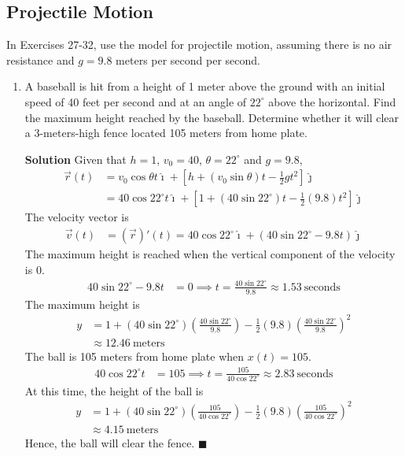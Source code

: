 \documentclass{report}
\begin{document}
\subsection*{Projectile Motion}
In Exercises 27-32, use the model for projectile motion, assuming there is no
air resistance and $g=9.8$ meters per second per second.
\begin{enumerate}
    \item  A baseball is hit from a height of 1 meter above the ground with an initial
          speed of 40 feet per second and at an angle of $22^{\circ}$ above the
          horizontal. Find the maximum height reached by the baseball. Determine whether
          it will clear a 3-meters-high fence located 105 meters from home plate.

          \textbf{Solution} Given that $h = 1$, $v_0 = 40$, $\theta = 22^{\circ}$ and $g = 9.8$,
          \begin{align*}
              \vec{r}(t) & = v_0\cos\theta t\hat{\imath} + \left[h + (v_0\sin\theta) t - \frac{1}{2}gt^2\right]\hat{\jmath}               \\
                         & = 40\cos{22^{\circ}} t\hat{\imath} + \left[1 + (40\sin{22^{\circ}}) t - \frac{1}{2}(9.8)t^2\right]\hat{\jmath}
          \end{align*}
          The velocity vector is
          \begin{align*}
              \vec{v}(t) & = (\vec{r})'(t) = 40\cos{22^{\circ}}\hat{\imath} + (40\sin{22^{\circ}} - 9.8t)\hat{\jmath}
          \end{align*}
          The maximum height is reached when the vertical component of the velocity is $0$.
          \begin{align*}
              40\sin{22^{\circ}} - 9.8t & = 0 \implies t = \frac{40\sin{22^{\circ}}}{9.8} \approx 1.53\ \text{seconds}
          \end{align*}
          The maximum height is
          \begin{align*}
              y & = 1 + (40\sin{22^{\circ}})\left(\frac{40\sin{22^{\circ}}}{9.8}\right) - \frac{1}{2}(9.8)\left(\frac{40\sin{22^{\circ}}}{9.8}\right)^2 \\
                & \approx 12.46\ \text{meters}
          \end{align*}
          The ball is 105 meters from home plate when $x(t) = 105$.
          \begin{align*}
              40\cos{22^{\circ}} t & = 105 \implies t = \frac{105}{40\cos{22^{\circ}}}  \approx 2.83\ \text{seconds}
          \end{align*}
          At this time, the height of the ball is
          \begin{align*}
              y & = 1 + (40\sin{22^{\circ}})\left(\frac{105}{40\cos{22^{\circ}}}\right) - \frac{1}{2}(9.8)\left(\frac{105}{40\cos{22^{\circ}}}\right)^2 \\
                & \approx 4.15\ \text{meters}
          \end{align*}
          Hence, the ball will clear the fence. \hfill$\blacksquare$


\end{enumerate}
\end{document}
